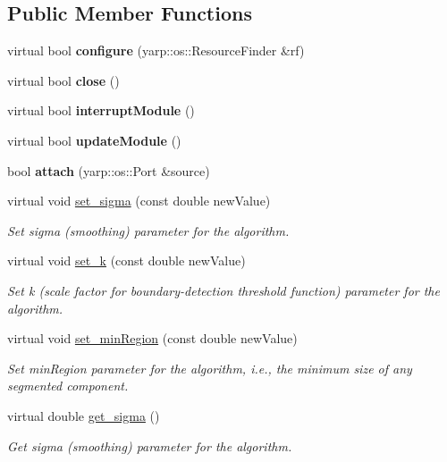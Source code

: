\subsection*{Public Member Functions}
\begin{DoxyCompactItemize}
\item 
\mbox{\label{classGBSegmModule_ada22cbfc66dd9b75a7a824e1ce642639}} 
virtual bool {\bfseries configure} (yarp\+::os\+::\+Resource\+Finder \&rf)
\item 
\mbox{\label{classGBSegmModule_ac3259b29883674bf47aa962f54806913}} 
virtual bool {\bfseries close} ()
\item 
\mbox{\label{classGBSegmModule_a99b9908ade3135dd5ee491b799d5e171}} 
virtual bool {\bfseries interrupt\+Module} ()
\item 
\mbox{\label{classGBSegmModule_a66f40b6ae480a039a2c10f6b91c59dde}} 
virtual bool {\bfseries update\+Module} ()
\item 
\mbox{\label{classGBSegmModule_a4ae8d5fee391d799299a10e09a5ea8c4}} 
bool {\bfseries attach} (yarp\+::os\+::\+Port \&source)
\item 
virtual void \hyperlink{classGBSegmModule_a27ffe08d394d321d9f9441423d36ef5e}{set\+\_\+sigma} (const double new\+Value)
\begin{DoxyCompactList}\small\item\em Set sigma (smoothing) parameter for the algorithm. \end{DoxyCompactList}\item 
virtual void \hyperlink{classGBSegmModule_a15129913273e221a46c428f697e40575}{set\+\_\+k} (const double new\+Value)
\begin{DoxyCompactList}\small\item\em Set k (scale factor for boundary-\/detection threshold function) parameter for the algorithm. \end{DoxyCompactList}\item 
virtual void \hyperlink{classGBSegmModule_ae1c722c9c774cbde4f6bfada3f0826ba}{set\+\_\+min\+Region} (const double new\+Value)
\begin{DoxyCompactList}\small\item\em Set min\+Region parameter for the algorithm, i.\+e., the minimum size of any segmented component. \end{DoxyCompactList}\item 
virtual double \hyperlink{classGBSegmModule_ae32ae1b1461e19c3a1b2f429c729ed03}{get\+\_\+sigma} ()
\begin{DoxyCompactList}\small\item\em Get sigma (smoothing) parameter for the algorithm. \end{DoxyCompactList}\item 

\end{DoxyCompactItemize}
